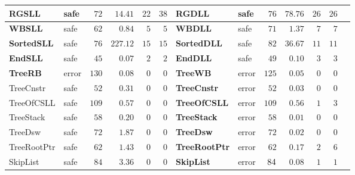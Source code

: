 \documentclass{beamer}
\newcommand{\safe}[0]{safe}
\newcommand{\unsafe}[0]{error}
\begin{document}
\begin{frame}
\begin{center}
\begin{adjustbox}{max height=\textheight, max width=\textwidth}
\begin{tabular}{| l | l | r | r | r | r || l | l | r | r | r | r | r |}
        \hline
		\rowcolor{rowgray}
		\textbf{RGSLL}       & \safe & $72$ & $14.41$  &  $22$  & $38$ & \textbf{RGDLL} & \safe & $76$ &  $78.76$ & $26$ & $26$ \\
        \hline
		\rowcolor{rowgray}
		\textbf{WBSLL}       & \safe & $62$ & $0.84$   &  $5$  & $5$ & \textbf{WBDLL} & \safe & $71$ &  $1.37$  & $7$ & $7$ \\
        \hline
		\rowcolor{rowgray}
		\textbf{SortedSLL}   & \safe & $76$ & $227.12$ &  $15$ & $15$ & \textbf{SortedDLL} & \safe & $82$ &  $36.67$ & $11$ & $11$ \\
        \hline
		\rowcolor{rowgray}
		\textbf{EndSLL}      & \safe  & $45$ & $0.07$   &  $2$  & $2$ & \textbf{EndDLL} & \safe & $49$ &  $0.10$  & $3$ & $3$ \\
        \hline
		\rowcolor{rowgray}
		\textbf{TreeRB} & \unsafe & $130$ &  $0.08$  & $0$  & $0$ & \textbf{TreeWB} & \unsafe & $125$ &  $0.05$  & $0$ & $0$ \\
        \hline
		TreeCnstr & \safe & $52$ & $0.31$  & $0$  & $0$ & \cellcolor{rowgray}\textbf{TreeCnstr} & \cellcolor{rowgray}\unsafe & \cellcolor{rowgray} $52$ & \cellcolor{rowgray} $0.03$  & \cellcolor{rowgray} $0$ & \cellcolor{rowgray} $0$ \\
        \hline
		TreeOfCSLL & \safe & $109$ &  $0.57$  & $0$  & $0$ & \cellcolor{rowgray}\textbf{TreeOfCSLL}  & \cellcolor{rowgray}\unsafe & \cellcolor{rowgray} $109$ & \cellcolor{rowgray} $0.56$  & \cellcolor{rowgray} $1$ & \cellcolor{rowgray} $3$ \\
        \hline
		TreeStack & \safe & $58$ &  $0.20$  & $0$  & $0$ & \cellcolor{rowgray}\textbf{TreeStack} & \cellcolor{rowgray}\unsafe & \cellcolor{rowgray} $58$ & \cellcolor{rowgray} $0.01$  & \cellcolor{rowgray} $0$ & \cellcolor{rowgray} $0$ \\
        \hline
		TreeDsw   & \safe & $72$ & $1.87$  & $0$  & $0$ & \cellcolor{rowgray}\textbf{TreeDsw} & \cellcolor{rowgray}\unsafe & \cellcolor{rowgray} $72$ & \cellcolor{rowgray} $0.02$  & \cellcolor{rowgray} $0$ &  \cellcolor{rowgray} $0$ \\
		\hline
		TreeRootPtr & \safe & $62$ &  $1.43$  & $0$  &  $0$ & \cellcolor{rowgray}\textbf{TreeRootPtr} & \cellcolor{rowgray}\unsafe & \cellcolor{rowgray} $62$ & \cellcolor{rowgray} $0.17$  & \cellcolor{rowgray} $2$ & \cellcolor{rowgray} $6$\\
        \hline
		SkipList    & \safe & $84$ & $3.36$  & $0$  & $0$ & \cellcolor{rowgray}\textbf{SkipList} & \cellcolor{rowgray}\unsafe & $\cellcolor{rowgray} 84$ & \cellcolor{rowgray} $0.08$  & \cellcolor{rowgray} $1$  & \cellcolor{rowgray} $1$ \\

\end{tabular}
\end{adjustbox}
\end{center}
\end{frame}
\end{document}
